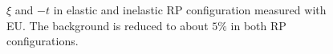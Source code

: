 \begin{enumerate}
\begin{figure}[H]
{		\begin{subfigure}[b]{\linewidth}{
				}
		\end{subfigure}
	}
	\quad
	\parbox{0.48\textwidth}{
		\centering
		\begin{subfigure}[b]{\linewidth}{
				}
		\end{subfigure}
	}
	\caption[x]{$\xi$ and $-t$ in elastic and inelastic RP configuration measured with EU. The background is reduced to about $5\%$ in both RP configurations.}
\end{figure}

\end{enumerate}
